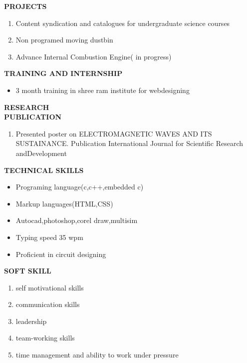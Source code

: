 \documentclass{article}
\begin{document}
\begin{flushleft}
	\vspace{0.30in}
	\textbf{PROJECTS}
	\begin{enumerate}
		\item Content syndication and catalogues for undergraduate science courses\\
		\item Non programed moving dustbin\\
		\item Advance Internal Combustion Engine( in progress)\\
		
	\end{enumerate}
\end{flushleft}

\begin{flushleft}
	\vspace{0.1in}
	\textbf{TRAINING AND INTERNSHIP}
	\begin{itemize}
		\item 3 month training in shree ram institute for webdesigning
	\end{itemize}
\end{flushleft}

\begin{flushleft}
	\vspace{.30in}
	\textbf{RESEARCH \\PUBLICATION}
	\begin{enumerate}
		\item Presented poster on ELECTROMAGNETIC WAVES AND ITS SUSTAINANCE. Publication International Journal for Scientific Research andDevelopment
	\end{enumerate}
\end{flushleft}

\begin{flushleft}
	\vspace{0.2in}
	\textbf{TECHNICAL SKILLS}
	\begin{itemize}
		\item Programing language(c,c++,embedded c)
		\item Markup languages(HTML,CSS)
		\item Autocad,photoshop,corel draw,multisim
		\item Typing speed 35 wpm
		\item Proficient in circuit designing
	\end{itemize}
\end{flushleft}

\begin{flushleft}
	\vspace{0.30in}
	\textbf{SOFT SKILL}
	\begin{enumerate}
		\item self motivational skills
		\item communication skills
		\item leadership 
		\item team-working skills
		\item time management and ability to work under pressure
	\end{enumerate}
\end{flushleft}
\end{document}
